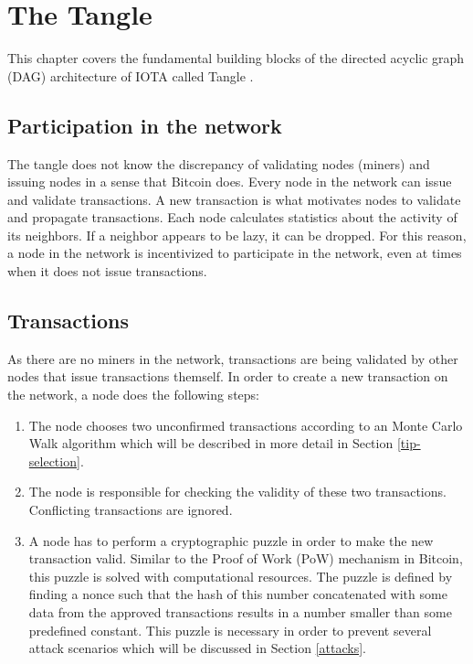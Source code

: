 \chapter{The Tangle}
This chapter covers the fundamental building blocks of the directed acyclic graph (DAG) architecture of IOTA called Tangle \cite{the-tangle}.
\section{Participation in the network}
The tangle does not know the discrepancy of validating nodes (miners) and issuing nodes in a sense that Bitcoin does. Every node in the network can issue and validate transactions. A new transaction is  
what motivates nodes to validate and propagate transactions. Each node calculates statistics about the activity of its neighbors. If a neighbor appears to be lazy, it can be dropped. For this reason, a node in the network is incentivized to participate in the network, even at times when it does not issue transactions. 

\section{Transactions}
As there are no miners in the network, transactions are being validated by other nodes that issue transactions themself. In order to create a new transaction on the network, a node does the following steps:
\begin{enumerate}
    \item The node chooses two unconfirmed transactions according to an Monte Carlo Walk algorithm which will be described in more detail in Section \ref{tip-selection}.
    \item The node is responsible for checking the validity of these two transactions. Conflicting transactions are ignored.
    \item A node has to perform a cryptographic puzzle in order to make the new transaction valid. Similar to the Proof of Work (PoW) mechanism in Bitcoin, this puzzle is solved with computational resources. The puzzle is defined by finding a nonce such that the hash of this number concatenated with some data from the approved transactions results in a number smaller than some predefined constant. This puzzle is necessary in order to prevent several attack scenarios which will be discussed in Section \ref{attacks}.
\end{enumerate}

